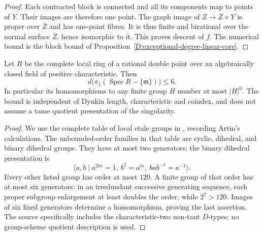 \begin{proof}
Each contracted block is connected and all its components map to
points of \(Y\).  Their images are therefore one point.  The graph
image of \(Z\to\overline Z\times Y\) is proper over \(\overline Z\)
and has one-point fibres.  It is thus finite and birational over
the normal surface \(\overline Z\), hence isomorphic to it.
This proves descent of \(f\).  The numerical bound is the block
bound of Proposition~\ref{D:exceptional-degree-linear-core}.
\end{proof}

\begin{lemma}
\label{D:RDP-uniform-local-generators}
Let \(R\) be the complete local ring of a rational double point
over an algebraically closed field of positive characteristic.
Then
\[
          d\bigl(\pi_1(\operatorname{Spec}R-\{\mathfrak m\})\bigr)
                    \le6.                               \tag{D.RC.2}
\]
In particular its homomorphisms to any finite group \(H\) number
at most \(|H|^6\).  The bound is independent of Dynkin length,
characteristic and coindex, and does not assume a tame quotient
presentation of the singularity.
\end{lemma}
\begin{proof}
We use the complete table of local etale groups in
\citet[Convention~1.3(2), p.~81, and Table~7, p.~93]
{C_Matsumoto2022RDP}, recording Artin's calculations.
The unbounded-order families in that table are cyclic, dihedral,
and binary dihedral groups.  They have at most two generators;
the binary dihedral presentation is
\[
 \langle a,b\mid a^{2m}=1,\ b^2=a^m,\ bab^{-1}=a^{-1}\rangle.
\]
Every other listed group has order at most \(120\).  A finite
group of that order has at most six generators: in an irredundant
successive generating sequence, each proper subgroup enlargement
at least doubles the order, while \(2^7>120\).
Images of six fixed generators determine a homomorphism, proving
the last assertion.  The source specifically includes the
characteristic-two non-taut \(D\)-types; no group-scheme quotient
description is used.
\end{proof}

